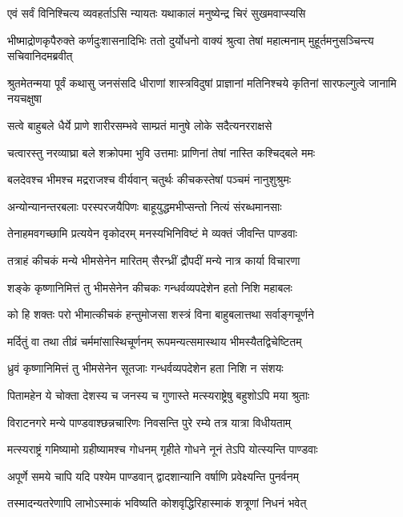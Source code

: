 \twolineshloka
{एवं सर्वं विनिश्चित्य व्यवहर्ताऽसि न्यायतः}
{यथाकालं मनुष्येन्द्र चिरं सुखमवाप्स्यसि}


\threelineshloka
{भीष्माद्रोणकृपैरुक्ते कर्णदुःशासनादिभिः}
{ततो दुर्योधनो वाक्यं श्रुत्वा तेषां महात्मनाम्}
{मुहूर्तमनुसञ्चिन्त्य सचिवानिदमब्रवीत्}


\threelineshloka
{श्रुतमेतन्मया पूर्वं कथासु जनसंसदि}
{धीराणां शास्त्रविदुषां प्राज्ञानां मतिनिश्चये}
{कृतिनां सारफल्गुत्वे जानामि नयचक्षुषा}


\twolineshloka
{सत्वे बाहुबले धैर्ये प्राणे शारीरसम्भवे}
{साम्प्रतं मानुषे लोके सदैत्यनरराक्षसे}


\twolineshloka
{चत्वारस्तु नरव्याघ्रा बले शक्रोपमा भुवि}
{उत्तमाः प्राणिनां तेषां नास्ति कश्चिद्बले ममः}


\twolineshloka
{बलदेवश्च भीमश्च मद्रराजश्च वीर्यवान्}
{चतुर्थः कीचकस्तेषां पञ्चमं नानुशुश्रुमः}


\twolineshloka
{अन्योन्यानन्तरबलाः परस्परजयैपिणः}
{बाहूयुद्धमभीप्सन्तो नित्यं संरब्धमानसाः}


\twolineshloka
{तेनाहमवगच्छामि प्रत्ययेन वृकोदरम्}
{मनस्यभिनिविष्टं मे व्यक्तं जीवन्ति पाण्डवाः}


\twolineshloka
{तत्राहं कीचकं मन्ये भीमसेनेन मारितम्}
{सैरन्ध्रीं द्रौपदीं मन्ये नात्र कार्या विचारणा}


\twolineshloka
{शङ्के कृष्णानिमित्तं तु भीमसेनेन कीचकः}
{गन्धर्वव्यपदेशेन हतो निशि महाबलः}


\twolineshloka
{को हि शक्तः परो भीमात्कीचकं हन्तुमोजसा}
{शस्त्रं विना बाहुबलात्तथा सर्वाङ्गचूर्णने}


\twolineshloka
{मर्दितुं वा तथा तीव्रं चर्ममांसास्थिचूर्णनम्}
{रूपमन्यत्समास्थाय भीमस्यैतद्विचेष्टितम्}


\twolineshloka
{ध्रुवं कृष्णानिमित्तं तु भीमसेनेन सूतजाः}
{गन्धर्वव्यपदेशेन हता निशि न संशयः}


\twolineshloka
{पितामहेन ये चोक्ता देशस्य च जनस्य च}
{गुणास्ते मत्स्यराष्ट्रेषु बहुशोऽपि मया श्रुताः}


\twolineshloka
{विराटनगरे मन्ये पाण्डवाश्छन्नचारिणः}
{निवसन्ति पुरे रम्ये तत्र यात्रा विधीयताम्}


\twolineshloka
{मत्स्यराष्ट्रं गमिष्यामो ग्रहीष्यामश्च गोधनम्}
{गृहीते गोधने नूनं तेऽपि योत्स्यन्ति पाण्डवाः}


\twolineshloka
{अपूर्णे समये चापि यदि पश्येम पाण्डवान्}
{द्वादशान्यानि वर्षाणि प्रवेक्ष्यन्ति पुनर्वनम्}


\twolineshloka
{तस्मादन्यतरेणापि लाभोऽस्माकं भविष्यति}
{कोशवृद्धिरिहास्माकं शत्रूणां निधनं भवेत्}



